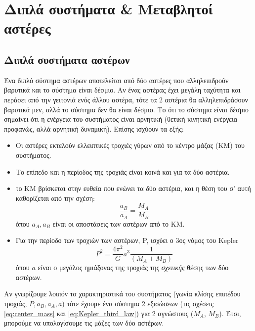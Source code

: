 \chapter{Διπλά συστήματα \& Μεταβλητοί αστέρες}
\label{ch:Chapter7}
{\hypersetup{linkcolor=black, pdfborder=0 0 1}
	\minitoc
}

\section{Διπλά συστήματα αστέρων}


Ένα διπλό σύστημα αστέρων αποτελείται από δύο αστέρες που αλληλεπιδρούν βαρυτικά και το σύστημα είναι δέσμιο. Αν ένας αστέρας έχει μεγάλη ταχύτητα και περάσει από την γειτονιά ενός άλλου αστέρα, τότε τα 2 αστέρια θα αλληλεπιδράσουν βαρυτικά μεν, αλλά το σύστημα δεν θα είναι δέσμιο.
Το ότι το σύστημα είναι δέσμιο σημαίνει ότι η ενέργεια του συστήματος είναι αρνητική (θετική κινητική ενέργεια προφανώς, αλλά αρνητική δυναμική). Επίσης ισχύουν τα εξής:

\begin{itemize}
    \item Οι αστέρες εκτελούν ελλειπτικές τροχιές γύρων από το κέντρο μάζας (ΚΜ) του συστήματος.
    \item Το επίπεδο και η περίοδος της τροχιάς είναι κοινά και για τα δύο αστέρια.
    \item το ΚΜ βρίσκεται στην ευθεία που ενώνει τα δύο αστέρια, και η θέση του σ' αυτή καθορίζεται από την σχέση:
        \begin{equation}
            \label{eq:center_mass}
            \frac{a_B}{a_A} = \frac{M_A}{M_B}
        \end{equation}
        όπου $a_A, a_B$ είναι οι αποστάσεις των αστέρων από το ΚΜ.
    \item Για την περίοδο των τροχιών των αστέρων, P, ισχύει ο 3ος νόμος του Kepler
        \begin{equation}
            \label{eq:Kepler_third_law}
            P^2 = \frac{4\pi^2}{G}a^3 \frac{1}{(M_A + M_B)}
        \end{equation}
        όπου $a$ είναι ο μεγάλος ημιάξονας της τροχιάς της \textit{σχετικής} θέσης των δύο αστέρων.
\end{itemize}

Αν γνωρίζουμε λοιπόν τα χαρακτηριστικά του συστήματος (γωνία κλίσης επιπέδου τροχιάς, $P, a_B, a_A, a$) τότε έχουμε ένα σύστημα 2 εξισώσεων (τις σχέσεις \eqref{eq:center_mass} και \eqref{eq:Kepler_third_law}) για 2 αγνώστους ($M_A$, $M_B$).  Έτσι, μπορούμε να υπολογίσουμε τις μάζες των δύο αστέρων.






